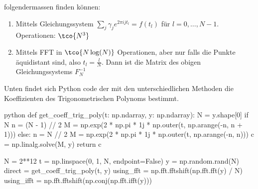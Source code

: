 \rmvspace\rmvspace
folgendermassen finden können: 
\begin{enumerate}[label=(\arabic*)]
    \item Mittels Gleichungssystem $\sum_{j} \gamma_j e^{2\pi ijt_l} = f(t_l)$ für $l = 0, \ldots, N - 1$. Operationen: $\tco{N^3}$
    \item Mittels FFT in $\tco{N \log(N)}$ Operationen, aber nur falls die Punkte äquidistant sind, also $t_l = \frac{l}{N}$.
        Dann ist die Matrix des obigen Gleichungssystems $F^{-1}_N$
\end{enumerate}

\vspace{0.2cm}

Unten findet sich Python code der mit den unterschiedlichen Methoden die Koeffizienten des Trigonometrischen Polynoms bestimmt.
\rmvspace
\begin{code}{python}
    def get_coeff_trig_poly(t: np.ndarray, y: np.ndarray):
        N = y.shape[0]
        if N %
            n = (N - 1) // 2
            M = np.exp(2 * np.pi * 1j * np.outer(t, np.arange(-n, n + 1)))
        else:
            n = N // 2
            M = np.exp(2 * np.pi * 1j * np.outer(t, np.arange(-n, n)))
        c = np.linalg.solve(M, y)
        return c

    N = 2**12
    t = np.linspace(0, 1, N, endpoint=False)
    y = np.random.rand(N)
    direct = get_coeff_trig_poly(t, y)
    using_fft = np.fft.fftshift(np.fft.fft(y) / N)
    using_ifft = np.fft.fftshift(np.conj(np.fft.ifft(y)))
\end{code}
